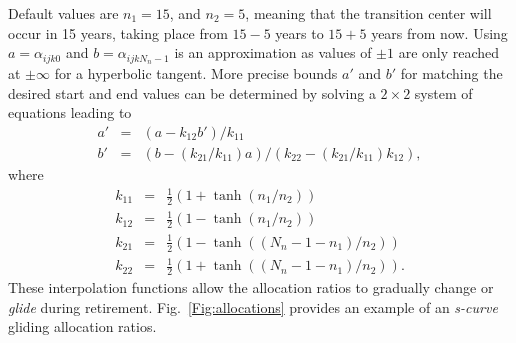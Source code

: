 \documentclass{report}[fleqn,11pt]
\begin{document}
\begin{description}[leftmargin=4em,style=multiline]
	Default values are $n_1 = 15$, and $n_2 = 5$, meaning that the transition center will occur
	in 15 years, taking place from $15-5$ years to $15+5$ years from now.
	Using $a = \alpha_{ijk0}$ and $b = \alpha_{ijkN_n-1}$ is an approximation as values of $\pm 1$
	are only reached at $\pm \infty$ for a hyperbolic tangent.
	More precise bounds $a'$ and $b'$ for matching the desired start and end values
	can be determined by solving a $2\times 2$ system of equations leading to
	\begin{eqnarray}
		a' &=& (a - k_{12}b')/k_{11} \nonumber \\
		b' &=& (b - (k_{21}/k_{11})a)/(k_{22} - (k_{21}/k_{11})k_{12}),
	\end{eqnarray}
	where
	\begin{eqnarray}
		k_{11} &=& \frac{1}{2}(1 + \tanh(n_1/n_2)) \nonumber \\
		k_{12} &=& \frac{1}{2}(1 - \tanh(n_1/n_2)) \nonumber \\
		k_{21} &=& \frac{1}{2}(1 - \tanh((N_n-1-n_1)/n_2)) \nonumber \\
		k_{22} &=& \frac{1}{2}(1 + \tanh((N_n-1-n_1)/n_2)).
	\end{eqnarray}
	These interpolation functions allow the allocation ratios to gradually change
	or {\em glide} during retirement. Fig.~\ref{Fig:allocations} provides an example
	of an {\em s-curve} gliding allocation ratios.


\end{description}
\end{document}
